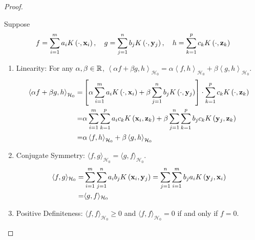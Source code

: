 \begin{proof}
\begin{enumerate}
		      Suppose
		      \begin{equation*}
			      f=\sum_{i=1}^{m}a_{i}K\left(\cdot,{\bf x}_{i}\right),\quad g=\sum_{j=1}^{n}b_{j}K\left(\cdot,\mathbf{y}_{j}\right),\quad h=\sum_{k=1}^{p}c_{k}K\left(\cdot,\mathbf{z}_{k}\right)
		      \end{equation*}
		      \begin{enumerate}
			      \item Linearity: For any $\alpha,\beta\in{\mathbb R}$, $\left\langle\alpha f+\beta g,h\right\rangle_{\mathcal{H}_{0}}=\alpha\left\langle f,h\right\rangle_{\mathcal{H}_{0}}+\beta\left\langle g,h\right\rangle_{\mathcal{H}_{0}}$.
			            \begin{equation*}
				            \begin{aligned}
					            \left\langle\alpha f+\beta g,h\right\rangle_{\mathcal{H}_{0}}= & \left[\alpha\sum_{i=1}^{m}a_{i}K\left(\cdot,{\bf x}_{i}\right)+\beta\sum_{j=1}^{n}b_{j}K\left(\cdot,\mathbf{y}_{j}\right)\right]\cdot\sum_{k=1}^{p}c_{k}K\left(\cdot,\mathbf{z}_{k}\right) \\
					            =                                                              & \alpha\sum_{i=1}^{m}\sum_{k=1}^{p}a_{i}c_{k}K\left({\bf x}_{i},\mathbf{z}_{k}\right)+\beta\sum_{j=1}^{n}\sum_{k=1}^{p}b_{j}c_{k}K\left(\mathbf{y}_{j},\mathbf{z}_{k}\right)                \\
					            =                                                              & \alpha\left\langle f,h\right\rangle_{\mathcal{H}_{0}}+\beta\left\langle g,h\right\rangle_{\mathcal{H}_{0}}
				            \end{aligned}
			            \end{equation*}
			      \item Conjugate Symmetry: $\langle f,g\rangle_{\mathcal{H}_{0}}=\langle g,f\rangle_{\mathcal{H}_{0}}$.
			            \begin{equation*}
				            \begin{aligned}
					            \langle f,g\rangle_{\mathcal{H}_{0}}= & \sum_{i=1}^{m}\sum_{j=1}^{n}a_{i}b_{j}K\left({\bf x}_{i},\mathbf{y}_{j}\right)=\sum_{j=1}^{n}\sum_{i=1}^{m}b_{j}a_{i}K\left(\mathbf{y}_{j},{\bf x}_{i}\right) \\
					            =                                     & \langle g,f\rangle_{\mathcal{H}_{0}}
				            \end{aligned}
			            \end{equation*}
			      \item Positive Definiteness: $\langle f,f\rangle_{\mathcal{H}_{0}}\geq 0$ and $\langle f,f\rangle_{\mathcal{H}_{0}}=0$ if and only if $f=0$.


\end{enumerate}
\end{enumerate}
\end{proof}
